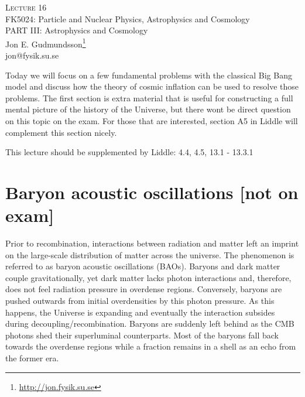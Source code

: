 \documentclass[a4paper,12pt]{article}
\theoremstyle{remark}
\renewcommand{\=}[1]{\stackrel{#1}{=}} %
\newcommand{\linkc}[1]{\textcolor{linkc}{#1}}
\theoremstyle{plain}
\theoremstyle{definition}
\begin{document}
\fontsize{5mm}{6mm}\selectfont\thispagestyle{empty}

\thispagestyle{empty}
\begin{center}
\textsc{Lecture 16}\\[1.5ex]
{\Huge FK5024: Particle and Nuclear Physics, Astrophysics and Cosmology\\}
\vspace{3mm}
{\large PART III: Astrophysics and Cosmology \\}
Jon E. Gudmundsson\footnote{\href{http://jon.fysik.su.se}{\linkc{http://jon.fysik.su.se}}} \\
\linkc{jon@fysik.su.se}
\end{center}
Today we will focus on a few fundamental problems with the classical Big Bang model and discuss how the theory of cosmic inflation can be used to resolve those problems. The first section is extra material that is useful for constructing a full mental picture of the history of the Universe, but there wont be direct question on this topic on the exam. For those that are interested, section A5 in Liddle will complement this section nicely.
\begin{attention}
This lecture should be supplemented by Liddle: 4.4, 4.5, 13.1 - 13.3.1
\end{attention}

\section{Baryon acoustic oscillations [not on exam]}
Prior to recombination, interactions between radiation and matter left an imprint on the large-scale distribution of matter across the universe. The phenomenon is referred to as baryon acoustic oscillations (BAOs). Baryons and dark matter couple gravitationally, yet dark matter lacks photon interactions and, therefore, does not feel radiation pressure in overdense regions. Conversely, baryons are pushed outwards from initial overdensities by this photon pressure. As this happens, the Universe is expanding and eventually the interaction subsides during decoupling/recombination. Baryons are suddenly left behind as the CMB photons shed their superluminal counterparts. Most of the baryons fall back towards the overdense regions while a fraction remains in a shell as an echo from the former era. 
\end{document}
